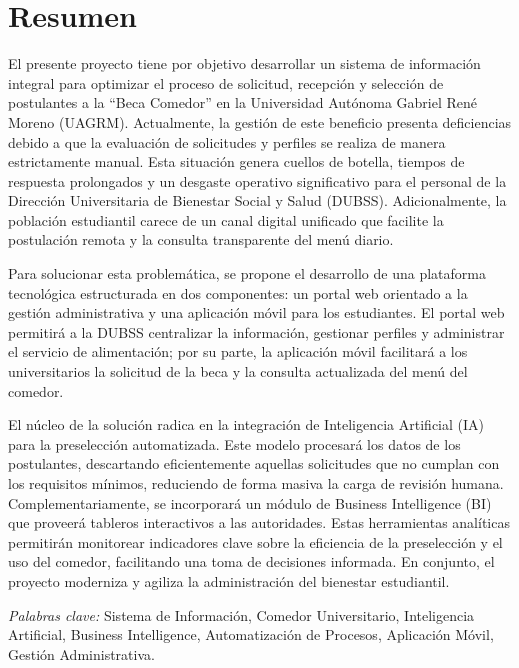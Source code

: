 
\section*{Resumen}

El presente proyecto tiene por objetivo desarrollar un sistema de información integral para optimizar el proceso de solicitud, recepción y selección de postulantes a la \enquote{Beca Comedor} en la Universidad Autónoma Gabriel René Moreno (UAGRM). Actualmente, la gestión de este beneficio presenta deficiencias debido a que la evaluación de solicitudes y perfiles se realiza de manera estrictamente manual. Esta situación genera cuellos de botella, tiempos de respuesta prolongados y un desgaste operativo significativo para el personal de la Dirección Universitaria de Bienestar Social y Salud (DUBSS). Adicionalmente, la población estudiantil carece de un canal digital unificado que facilite la postulación remota y la consulta transparente del menú diario.

Para solucionar esta problemática, se propone el desarrollo de una plataforma tecnológica estructurada en dos componentes: un portal web orientado a la gestión administrativa y una aplicación móvil para los estudiantes. El portal web permitirá a la DUBSS centralizar la información, gestionar perfiles y administrar el servicio de alimentación; por su parte, la aplicación móvil facilitará a los universitarios la solicitud de la beca y la consulta actualizada del menú del comedor.

El núcleo de la solución radica en la integración de Inteligencia Artificial (IA) para la preselección automatizada. Este modelo procesará los datos de los postulantes, descartando eficientemente aquellas solicitudes que no cumplan con los requisitos mínimos, reduciendo de forma masiva la carga de revisión humana. Complementariamente, se incorporará un módulo de Business Intelligence (BI) que proveerá tableros interactivos a las autoridades. Estas herramientas analíticas permitirán monitorear indicadores clave sobre la eficiencia de la preselección y el uso del comedor, facilitando una toma de decisiones informada. En conjunto, el proyecto moderniza y agiliza la administración del bienestar estudiantil.

\indent\textit{Palabras clave:} Sistema de Información, Comedor Universitario, Inteligencia Artificial, Business Intelligence, Automatización de Procesos, Aplicación Móvil, Gestión Administrativa.